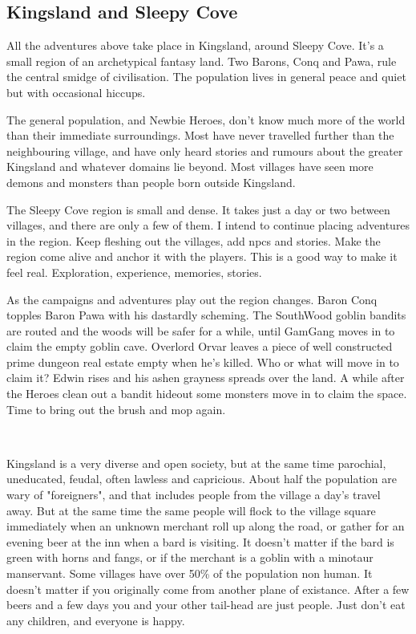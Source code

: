 \subsection*{Kingsland and Sleepy Cove}
All the adventures above take place in Kingsland, around Sleepy Cove. It's a small region of an archetypical fantasy land. Two Barons, Conq and Pawa, rule the central smidge of civilisation. The population lives in general peace and quiet but with occasional hiccups.

The general population, and Newbie Heroes, don't know much more of the world than their immediate surroundings. Most have never travelled further than the neighbouring village, and have only heard stories and rumours about the greater Kingsland and whatever domains lie beyond. Most villages have seen more demons and monsters than people born outside Kingsland.

The Sleepy Cove region is small and dense. It takes just a day or two between villages, and there are only a few of them.
I intend to continue placing adventures in the region. Keep fleshing out the villages, add npcs and stories. Make the region come alive and anchor it with the players. This is a good way to make it feel real. Exploration, experience, memories, stories.

As the campaigns and adventures play out the region changes. Baron Conq topples Baron Pawa with his dastardly scheming. The SouthWood goblin bandits are routed and the woods will be safer for a while, until GamGang moves in to claim the empty goblin cave. Overlord Orvar leaves a piece of well constructed prime dungeon real estate empty when he's killed. Who or what will move in to claim it? Edwin rises and his ashen grayness spreads over the land. A while after the Heroes clean out a bandit hideout some monsters move in to claim the space. Time to bring out the brush and mop again.

\

\label{sec:kingslandsociety}
Kingsland is a very diverse and open society, but at the same time parochial, uneducated, feudal, often lawless and capricious. About half the population are wary of "foreigners", and that includes people from the village a day's travel away. But at the same time the same people will flock to the village square immediately when an unknown merchant roll up along the road, or gather for an evening beer at the inn when a bard is visiting. It doesn't matter if the bard is green with horns and fangs, or if the merchant is a goblin with a minotaur manservant. Some villages have over 50\% of the population non human. It doesn't matter if you originally come from another plane of existance. After a few beers and a few days you and your other tail-head are just people. Just don't eat any children, and everyone is happy.

